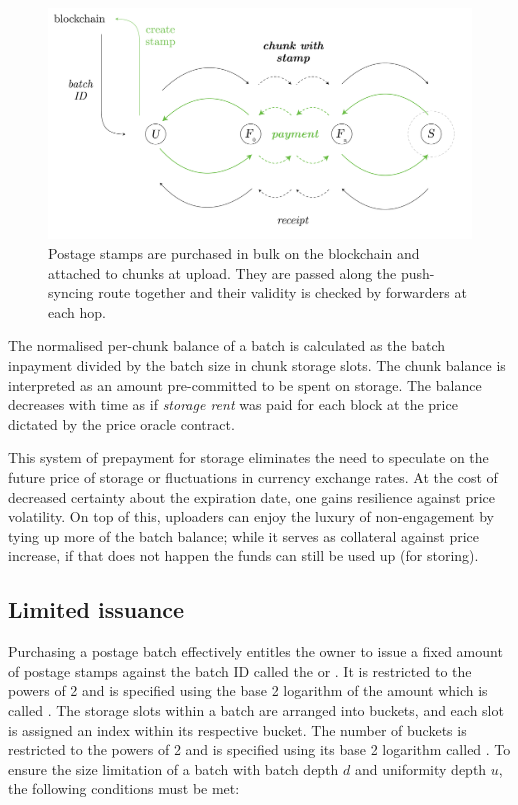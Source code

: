\begin{figure}[!th]
\centering
  \includegraphics[width=\textwidth]{fig/postage-stamp.pdf}
\caption[Postage stamps]{Postage stamps are purchased in bulk on the blockchain and attached to chunks at upload. They are passed along the push-syncing route together and their validity is checked by forwarders at each hop. }
\label{fig:postage-stamps}
\end{figure}

The normalised per-chunk balance of a batch is calculated as the batch inpayment divided by the batch size in chunk storage slots. The chunk balance is interpreted as an amount pre-committed to be spent on storage. The balance decreases with time as if \emph{storage rent} was paid for each block at the price dictated by the price oracle contract.  

This system of prepayment for storage eliminates the need to speculate on the future price of storage or fluctuations in currency exchange rates. At the cost of decreased certainty about the expiration date, one gains resilience against price volatility. On top of this, uploaders can enjoy the luxury of non-engagement by tying up more of the batch balance; while it serves as collateral against price increase, if that does not happen the funds can still be used up (for storing).


\subsection{Limited issuance}\label{sec:limited-issuance}


Purchasing a postage batch effectively entitles the owner to issue a fixed amount of postage stamps against the batch ID called the  or . It is restricted to the powers of 2 and is specified using the base 2 logarithm of the amount which is called . The storage slots within a batch are arranged into buckets, and each slot is assigned an index within its respective bucket. The number of buckets is restricted to the powers of 2 and is specified using its base 2 logarithm called . To ensure the size limitation of a batch with batch depth $d$ and uniformity depth $u$, the following conditions must be met: 

